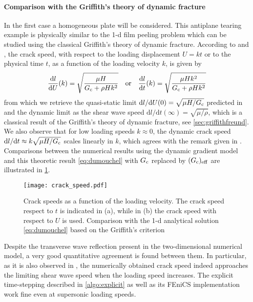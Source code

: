 \paragraph{Comparison with the Griffith's theory of dynamic fracture} In the first case a homogeneous plate will be considered. This antiplane tearing example is physically similar to the 1-d film peeling problem which can be studied using the classical Griffith's theory of dynamic fracture. According to \cite{DumouchelMarigoCharlotte:2008} and \cite{BourdinFrancfortMarigo:2008}, the crack speed, with respect to the loading displacement $U=kt$ or to the physical time $t$, as a function of the loading velocity $k$, is given by
\begin{equation} \label{eq:dumouchel}
\frac{\mathrm{d} l}{\mathrm{d} U}(k)=\sqrt{\frac{\mu H}{G_\mathrm{c}+\rho Hk^2}}\quad\text{or}\quad\frac{\mathrm{d} l}{\mathrm{d} t}(k)=\sqrt{\frac{\mu Hk^2}{G_\mathrm{c}+\rho Hk^2}}
\end{equation}
from which we retrieve the quasi-static limit $\mathrm{d} l/\mathrm{d} U(0)=\sqrt{\mu H/G_\mathrm{c}}$ predicted in \cite{BourdinFrancfortMarigo:2008} and the dynamic limit as the shear wave speed $\mathrm{d} l/\mathrm{d} t(\infty)=\sqrt{\mu/\rho}$, which is a classical result of the Griffith's theory of dynamic fracture, see \cref{sec:griffithfreund}. We also observe that for low loading speeds $k\approx 0$, the dynamic crack speed $\mathrm{d} l/\mathrm{d} t\approx k\sqrt{\mu H/G_\mathrm{c}}$ scales linearly in $k$, which agrees with the remark given in \cite{Bourdin:2011}. Comparisons between the numerical results using the dynamic gradient model and this theoretic result \eqref{eq:dumouchel} with $G_\mathrm{c}$ replaced by $(G_\mathrm{c})_\mathrm{eff}$ are illustrated in \cref{fig:mode3}.
\begin{figure}[htbp]
\centering
\texttt{[image: crack\_speed.pdf]}
\caption{Crack speeds as a function of the loading velocity. The crack speed respect to $t$ is indicated in (a), while in (b) the crack speed with respect to $U$ is used. Comparison with the 1-d analytical solution \eqref{eq:dumouchel} based on the Griffith's criterion} \label{fig:mode3}
\end{figure}
Despite the transverse wave reflection present in the two-dimensional numerical model, a very good quantitative agreement is found between them. In particular, as it is also observed in \cite{Bourdin:2011}, the numerically obtained crack speed indeed approaches the limiting shear wave speed when the loading speed increases. The explicit time-stepping described in \cref{algo:explicit} as well as its FEniCS implementation work fine even at supersonic loading speeds.

